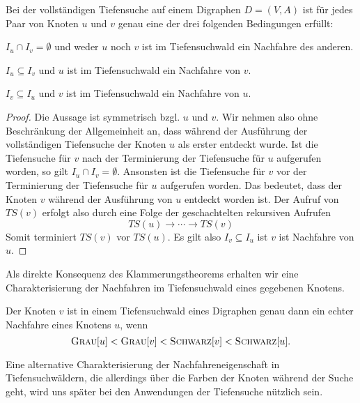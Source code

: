 \begin{thm}[Klammerungstheorem]
\label{thm:klammerung}
Bei der vollständigen Tiefensuche auf einem Digraphen $D=(V,A)$ ist für jedes Paar von Knoten $u$ und $v$ genau eine der drei folgenden Bedingungen erfüllt:
\begin{enuma}

 \item $I_u \cap I_v = \emptyset$  und weder $u$ noch $v$ ist im Tiefensuchwald ein Nachfahre des anderen.

 \item $I_u \subseteq I_v$ und $u$ ist im Tiefensuchwald ein Nachfahre von $v$.

 \item $I_v \subseteq I_u$ und $v$ ist im Tiefensuchwald ein Nachfahre von $u$.

\end{enuma}
\end{thm}
\begin{proof}
	Die Aussage ist symmetrisch bzgl. $u$ und $v$. Wir  nehmen also ohne Beschränkung der Allgemeinheit an, dass während der Ausführung der vollständigen Tiefensuche der Knoten $u$ als erster entdeckt wurde. Ist die Tiefensuche für $v$ nach der Terminierung der Tiefensuche für $u$ aufgerufen worden, so gilt $I_u \cap I_v = \emptyset$. Ansonsten ist die Tiefensuche für $v$ vor der Terminierung der Tiefensuche für $u$ aufgerufen worden. Das bedeutet, dass der Knoten $v$ während der Ausführung von $u$ entdeckt worden ist. Der Aufruf von $TS(v)$ erfolgt also durch eine Folge der geschachtelten rekursiven Aufrufen 
	\[
		TS(u) \xrightarrow{} \cdots \xrightarrow{} TS(v) 
	\] 
	Somit terminiert $TS(v)$ vor $TS(u)$. Es gilt also $I_v \subseteq I_u$ ist $v$ ist Nachfahre von $u$. 
\end{proof}

\begin{bem}
Als direkte Konsequenz des Klammerungstheorems erhalten wir eine Charakterisierung der Nachfahren im Tiefensuchwald eines gegebenen Knotens.
\end{bem} 

\begin{kor}
\label{cor:nachfahre-tiefenwald}
Der Knoten $v$ ist in einem Tiefensuchwald eines Digraphen genau dann ein echter Nachfahre eines Knotens $u$, wenn
\[
\mathop{\text{\textsc{Grau}}}[u] < \mathop{\text{\textsc{Grau}}}[v] < \mathop{\text{\textsc{Schwarz}}}[v]  < \mathop{\text{\textsc{Schwarz}}}[u].
\]
\end{kor}

\begin{bem} 
Eine alternative Charakterisierung der Nachfahreneigenschaft in Tiefensuchwäldern, die allerdings über die Farben der Knoten während der Suche geht, wird uns später bei den Anwendungen der Tiefensuche nützlich sein. 
\end{bem} 

